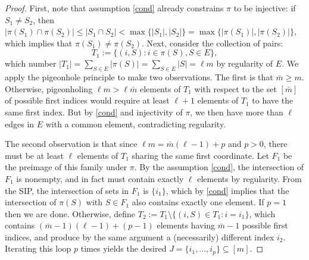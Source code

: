 \documentclass[9pt,twocolumn]{pnas-new}
\begin{document}
\begin{proof}
First, note that assumption \eqref{cond} already constrains $\pi$ to be injective:  if $S_1 \neq S_2$, then $|\pi(S_1) \cap \pi(S_2)| \leq |S_1 \cap S_2| < \max\{|S_1|, |S_2|\} = \max\{|\pi(S_1)|, |\pi(S_2)|\}$, which implies that $\pi(S_1) \neq \pi(S_2)$.  Next, consider the collection of pairs: \[T_1 := \{(i, S): i \in \pi(S), S \in E\},\] which number $|T_1| = \sum_{S \in E} |\pi(S)| = \sum_{S \in E} |S| = \ell m$ by regularity of $E$. We apply the pigeonhole principle to make two observations. 
The first is that $\bar m \geq m$. Otherwise, pigeonholing $\ell m > \ell \bar m$ elements of $T_1$ with respect to the set $[\bar m]$ of possible first indices would require at least $\ell + 1$ elements of $T_1$ to have the same first index. But by \eqref{cond} and injectivity of $\pi$, we then have more than $\ell$ edges in $E$ with a common element, contradicting regularity. 

The second observation is that since $\ell m = \bar m (\ell - 1) + p$ and $p > 0$, there must be at least $\ell$ elements of $T_1$ sharing the same first coordinate. Let $F_1$ be the preimage of this family under $\pi$.  By the assumption \eqref{cond}, the intersection of $F_1$ is nonempty, and in fact must contain exactly $\ell$ elements by regularity. 
From the SIP, the intersection of sets in $F_1$ is $\{i_1\}$, which by \eqref{cond} implies that the intersection of $\pi(S)$ with $S \in F_1$ also contains exactly one element.  If $p = 1$ then we are done. Otherwise, define $T_2 := T_1 \setminus \{(i,S) \in T_1: i = i_1\}$, which contains $(\bar m - 1)(\ell -1) + (p-1)$ elements having $\bar m - 1$ possible first indices, and produce by the same argument a (necessarily) different index $i_2$. Iterating this loop $p$ times yields the desired $J = \{i_1, \ldots, i_p\} \subseteq [m]$.
\end{proof}
\end{document}

